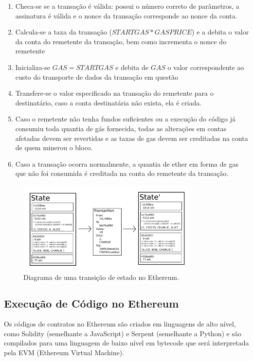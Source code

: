\begin{enumerate}
\item Checa-se se a transação é válida: possui o número correto de parâmetros, a assinatura é válida e o nonce da transação corresponde ao nonce da conta.
\item Calcula-se a taxa da transação (\(STARTGAS * GASPRICE\)) e a debita o valor da conta do remetente da transação, bem como incrementa o nonce do remetente
\item Inicializa-se \(GAS = STARTGAS\) e debita de \(GAS\) o valor correspondente ao custo do transporte de dados da transação em questão
\item Transfere-se o valor especificado na transação do remetente para o destinatário, caso a conta destinatária não exista, ela é criada.
\item Caso o remetente não tenha fundos suficientes ou a execução do código já consumiu toda quantia de gás fornecida, todas as alterações em contas afetadas devem ser revertidas e as taxas de gas devem ser creditadas na conta de quem minerou o bloco.
\item Caso a transação ocorra normalmente, a quantia de ether em forma de gas que não foi consumida é creditada na conta do remetente da transação.
\end{enumerate}

\begin{figure}[ht]
\centering
\includegraphics[width=0.8\textwidth]{Cap1/ethereum_state_transiction_function}
\caption{Diagrama de uma transição de estado no Ethereum.}
\label{ethereum_state_transiction_function}
\end{figure}

\subsection{Execução de Código no Ethereum}

Os códigos de contratos no Ethereum são criados em linguagens de alto nível, como Solidity (semelhante a JavaScript) e Serpent (semelhante a Python) e são compilados para uma linguagem de baixo nível em bytecode que será interpretada pela EVM (Ethereum Virtual Machine).

